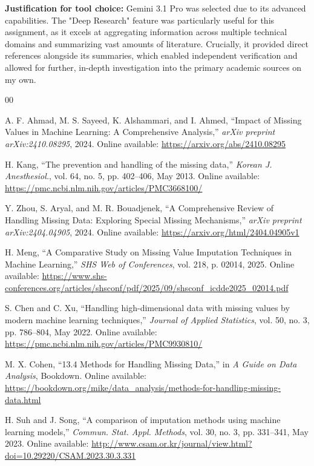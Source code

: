 \documentclass[journal]{IEEEtran}
\begin{document}
\noindent \textbf{Justification for tool choice:} Gemini 3.1 Pro was selected due to its advanced capabilities. The "Deep Research" feature was particularly useful for this assignment, as it excels at aggregating information across multiple technical domains and summarizing vast amounts of literature. Crucially, it provided direct references alongside its summaries, which enabled independent verification and allowed for further, in-depth investigation into the primary academic sources on my own.


\begin{thebibliography}{00}

A. F. Ahmad, M. S. Sayeed, K. Alshammari, and I. Ahmed, ``Impact of Missing Values in Machine Learning: A Comprehensive Analysis,'' \textit{arXiv preprint arXiv:2410.08295}, 2024. Online available: \url{https://arxiv.org/abs/2410.08295}

H. Kang, ``The prevention and handling of the missing data,'' \textit{Korean J. Anesthesiol.}, vol. 64, no. 5, pp. 402--406, May 2013. Online available: \url{https://pmc.ncbi.nlm.nih.gov/articles/PMC3668100/}

Y. Zhou, S. Aryal, and M. R. Bouadjenek, ``A Comprehensive Review of Handling Missing Data: Exploring Special Missing Mechanisms,'' \textit{arXiv preprint arXiv:2404.04905}, 2024. Online available: \url{https://arxiv.org/html/2404.04905v1}

H. Meng, ``A Comparative Study on Missing Value Imputation Techniques in Machine Learning,'' \textit{SHS Web of Conferences}, vol. 218, p. 02014, 2025. Online available: \url{https://www.shs-conferences.org/articles/shsconf/pdf/2025/09/shsconf_icdde2025_02014.pdf}

S. Chen and C. Xu, ``Handling high-dimensional data with missing values by modern machine learning techniques,'' \textit{Journal of Applied Statistics}, vol. 50, no. 3, pp. 786--804, May 2022. Online available: \url{https://pmc.ncbi.nlm.nih.gov/articles/PMC9930810/}

M. X. Cohen, ``13.4 Methods for Handling Missing Data,'' in \textit{A Guide on Data Analysis}, Bookdown. Online available: \url{https://bookdown.org/mike/data_analysis/methods-for-handling-missing-data.html}

H. Suh and J. Song, ``A comparison of imputation methods using machine learning models,'' \textit{Commun. Stat. Appl. Methods}, vol. 30, no. 3, pp. 331--341, May 2023. Online available: \url{http://www.csam.or.kr/journal/view.html?doi=10.29220/CSAM.2023.30.3.331}


\end{thebibliography}
\end{document}
